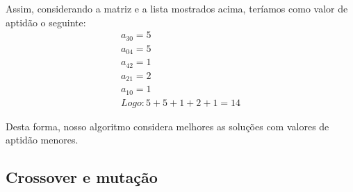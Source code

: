 \documentclass[a4paper,12pt]{article}
\begin{document}
  Assim, considerando a matriz e a lista mostrados acima, teríamos como valor de
  aptidão o seguinte:
  \begin{align*}
    a_{30}=5 \\
    a_{04}=5 \\
    a_{42}=1 \\
    a_{21}=2 \\
    a_{10}=1 \\
    Logo: 5+5+1+2+1 = 14
  \end{align*}

  Desta forma, nosso algoritmo considera melhores as soluções com valores de
  aptidão menores.

  \subsection{Crossover e mutação}
\end{document}
